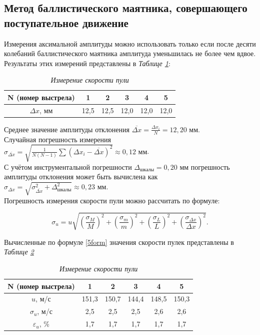 \documentclass[a4paper,12pt]{article} %
\begin{document}
\subsection{Метод баллистического маятника, совершающего поступательное движение}


Измерения аксимальной амплитуды можно использовать только если после десяти колебаний баллистического маятника амплитуда уменьшилась не более чем вдвое. Результаты этих измерений представлены в \textit{Таблице \ref{tab:tab-amp}}:

\begin{table}[!ht]
    \centering
    \begin{tabular}{|c|c|c|c|c|c|}
    \hline
        N (номер выстрела) & 1 & 2 & 3 & 4 & 5 \\ \hline
        $\Delta x$, мм & 12,5 & 12,5 & 12,0 & 12,0 & 12,0 \\ \hline
    \end{tabular}
    \caption{\textit{Измерение скорости пули}}
    \label{tab:tab-amp}
\end{table}

Среднее значение амплитуды отклонения $ \overline{\Delta x} = \frac{\Delta x_i}{N} = 12,20 \text{ мм}$.\\

Случайная погрешность измерения $ \sigma_{\overline{\Delta x}} = \sqrt{\frac{1}{N  (N-1)}\sum(\Delta x_i-\overline{\Delta x})^2} \approx 0,12 \text{ мм}$.\\

С учётом инструментальной погрешности $ \Delta_\text{шкалы} = 0,20$ мм погрешность амплитуды отклонения может быть вычислена как $ \sigma_{\Delta x} = \sqrt{\sigma^2_{\overline{\Delta x}} + \Delta^2_{\text{шкалы}}} \approx 0,23 \text{ мм}$. \\


Погрешность измерения скорости пули можно рассчитать по формуле:

\begin{equation}
\sigma_u = u \sqrt{\left( \frac{\sigma_M}{M} \right) ^2 + \left( \frac{\sigma_m}{m} \right) ^2 + \left( \frac{\sigma_L}{L} \right) ^2 + \left( \frac{\sigma_{\Delta x}}{\Delta x} \right) ^2}.
\label{13form}
\end{equation}

Вычисленные по формуле \eqref{5form} значения скорости пулек представлены в \textit{Таблице  \ref{tab:tab2}}

\begin{table}[!ht]
    \centering
    \begin{tabular}{|c|c|c|c|c|c|}
    \hline
        N (номер выстрела) & 1 & 2 & 3 & 4 & 5 \\ \hline
        $u$, м/с & 151,3 & 150,7 & 144,4 & 148,5 & 150,3 \\ \hline
        $\sigma_u$, м/с & 2,5 & 2,5 & 2,5 & 2,6 & 2,6 \\ \hline
        $\varepsilon_u$, \% & 1,7 & 1,7 & 1,7 & 1,7 & 1,7 \\ \hline
    \end{tabular}
    \caption{\textit{Измерение скорости пули}}
    \label{tab:tab2}
\end{table}
\end{document}

